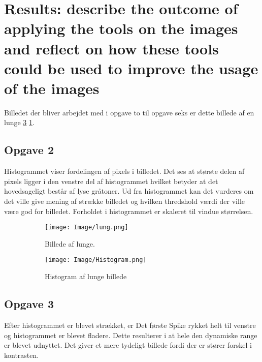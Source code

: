 \documentclass{article}
\begin{document}
\section{Results:  describe the outcome of applying the tools on the images and reflect on how these tools could be used to improve the usage of the images} 

  

Billedet der bliver arbejdet med i opgave to til opgave seks er dette billede af en lunge \ref{fig:image1} \ref{fig:f1}.\newline 

  

\subsection{Opgave 2} 

Histogrammet viser fordelingen af pixels i billedet. Det ses at største delen af pixels ligger i den venstre del af histogrammet hvilket betyder at det hovedsageligt består af lyse gråtoner. Ud fra histogrammet kan det vurderes om det ville give mening af strække billedet og hvilken thredshold værdi der ville være god for billedet. Forholdet i histogrammet er skaleret til vindue størrelsen. 

  

\begin{figure}[!h] 
  \begin{subfigure}[b]{0.49\linewidth} 
    \texttt{[image: Image/lung.png]} 
    \caption{Billede af lunge.} 
    \label{fig:f1} 
  \end{subfigure} 
  \hfill 
  \begin{subfigure}[b]{0.49\linewidth} 
    \texttt{[image: Image/Histogram.png]} 
    \caption{Histogram af lunge billede} 
    \label{fig:f2} 
  \end{subfigure} 
      \caption{} 
    \label{fig:image1} 
\end{figure} 

  

\subsection{Opgave 3} 

Efter histogrammet er blevet strækket, er Det første Spike rykket helt til venstre og histogrammet er blevet fladere. Dette resulterer i at hele den dynamiske range er blevet udnyttet. Det giver et mere tydeligt billede fordi der er stører forskel i kontrasten.  
\end{document}
